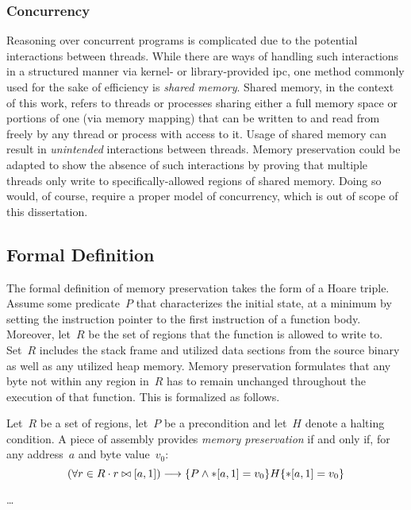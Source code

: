 \subsubsection{Concurrency}
Reasoning over concurrent programs is complicated
due to the potential interactions between threads.
While there are ways of handling such interactions in a structured manner
via kernel- or library-provided \ac{ipc},
one method commonly used for the sake of efficiency is \emph{shared memory}.
Shared memory, in the context of this work,
refers to threads or processes sharing either a full memory space
or portions of one (via memory mapping)
that can be written to and read from freely by any thread or process with access to it.
Usage of shared memory can result in \emph{unintended} interactions between threads.
Memory preservation could be adapted to show the absence of such interactions
by proving that multiple threads only write
to specifically-allowed regions of shared memory.
Doing so would, of course, require a proper model of concurrency,
which is out of scope of this dissertation.

\subsection{Formal Definition}
The formal definition of memory preservation takes the form of a Hoare triple.%
%
Assume some predicate~$P$ that characterizes the initial state, at a minimum
by setting the instruction pointer to the first instruction of a function body.
Moreover, let~$R$ be the set of regions that the function is allowed to write to.
Set~$R$ includes the stack frame and utilized data sections from the source binary
as well as any utilized heap memory.
Memory preservation formulates that any byte not within any region in~$R$ has to remain unchanged throughout the execution of that function.
This is formalized as follows.
\begin{definition}
  Let~$R$ be a set of regions, let~$P$ be a precondition and let~$H$ denote a halting condition.
  A piece of assembly provides \emph{memory preservation} if and only if, for any address~$a$ and byte value~$v_0$:
  \begin{equation}
  (\forall r\in R\cdot r\bowtie[a,1])\longrightarrow\{P\wedge \ast[a,1]=v_0\}H\{\ast[a,1]=v_0\}
  \end{equation}
\end{definition}


\todo\dots


